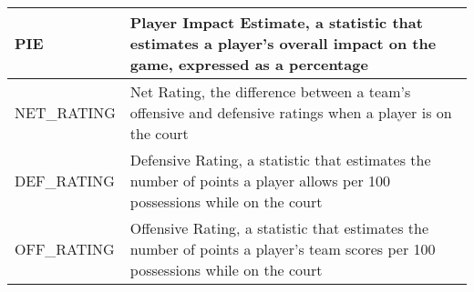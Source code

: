 \documentclass[12pt]{article}
\begin{document}
\begin{table}[htbp]
\begin{tabular}{|l|p{10cm}|}
        \hline
        PIE & Player Impact Estimate, a statistic that estimates a player's overall impact on the game, expressed as a percentage \\
        \hline
        NET\_RATING & Net Rating, the difference between a team's offensive and defensive ratings when a player is on the court \\
        \hline
        DEF\_RATING & Defensive Rating, a statistic that estimates the number of points a player allows per 100 possessions while on the court \\
        \hline
        OFF\_RATING & Offensive Rating, a statistic that estimates the number of points a player's team scores per 100 possessions while on the court \\
        \hline
        \end{tabular}
        \end{table}
\end{document}

